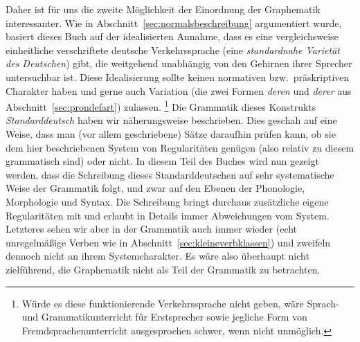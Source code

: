 Daher ist für uns die zweite Möglichkeit der Einordnung der Graphematik interessanter.
Wie in Abschnitt~\ref{sec:normalsbeschreibung} argumentiert wurde, basiert dieses Buch auf der idealisierten Annahme, dass es eine vergleichsweise einheitliche verschriftete deutsche Verkehrssprache (eine \textit{standardnahe Varietät des Deutschen}) gibt, die weitgehend unabhängig von den Gehirnen ihrer Sprecher untersuchbar ist.
Diese Idealisierung sollte keinen normativen bzw.\ präskriptiven Charakter haben und gerne auch Variation (\zB die zwei Formen \textit{deren} und \textit{derer} aus Abschnitt~\ref{sec:prondefart}) zulassen.%
\footnote{Würde es diese funktionierende Verkehrssprache nicht geben, wäre Sprach- und Grammatikunterricht für Erstsprecher sowie jegliche Form von Fremdsprachenunterricht ausgesprochen schwer, wenn nicht unmöglich.}
Die Grammatik dieses Konstrukts \textit{Standarddeutsch} haben wir näherungsweise beschrieben.
Dies geschah auf eine Weise, dass man (vor allem geschriebene) Sätze daraufhin prüfen kann, ob sie dem hier beschriebenen System von Regularitäten genügen (also relativ zu diesem grammatisch sind) oder nicht.
In diesem Teil des Buches wird nun gezeigt werden, dass die Schreibung dieses Standarddeutschen auf sehr systematische Weise der Grammatik folgt, und zwar auf den Ebenen der Phonologie, Morphologie und Syntax.
Die Schreibung bringt durchaus zusätzliche eigene Regularitäten mit und erlaubt in Details immer Abweichungen vom System.
Letzteres sehen wir aber in der Grammatik auch immer wieder (\zB echt unregelmäßige Verben wie in Abschnitt~\ref{sec:kleineverbklassen}) und zweifeln dennoch nicht an ihrem Systemcharakter.
Es wäre also überhaupt nicht zielführend, die Graphematik nicht als Teil der Grammatik zu betrachten.

